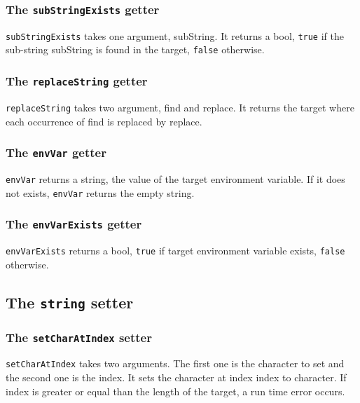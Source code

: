 \documentclass[10pt,openright,twosides]{report}
\newcommand{\gtlarg}[1]{{\footnotesize\ttfamily\colorbox{light-blue}{#1}}}
\newcommand{\gtlinline}[1]{\colorbox{light-blue}{\lstinline[language=gtl]{#1}}}
\begin{document}
\subsubsection{The \texttt{subStringExists} getter}

\gtlinline{subStringExists} takes one argument, \gtlarg{subString}. It returns a bool, \gtlinline{true} if the sub-string \gtlarg{subString} is found in the target, \gtlinline{false} otherwise.

\subsubsection{The \texttt{replaceString} getter}

\gtlinline{replaceString} takes two argument, \gtlarg{find} and \gtlarg{replace}. It returns the target where each occurrence of \gtlarg{find} is replaced by \gtlarg{replace}.

\subsubsection{The \texttt{envVar} getter}

\gtlinline{envVar} returns a string, the value of the target environment variable. If it does not exists, \gtlinline{envVar} returns the empty string.

\subsubsection{The \texttt{envVarExists} getter}

\gtlinline{envVarExists} returns a bool, \gtlinline{true} if target environment variable exists, \gtlinline{false} otherwise.

\subsection{The \texttt{string} setter}

\subsubsection{The \texttt{setCharAtIndex} setter}

\gtlinline{setCharAtIndex} takes two arguments. The first one is the \gtlarg{character} to set and the second one is the \gtlarg{index}. It sets the character at index \gtlarg{index} to \gtlarg{character}. If \gtlarg{index} is greater or equal than the length of the target, a run time error occurs.
\end{document}
